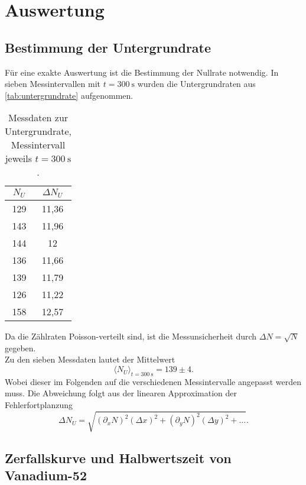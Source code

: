\section{Auswertung}
\label{sec:Auswertung}

\subsection{Bestimmung der Untergrundrate}
\label{sec:aus:untergrundrate}

Für eine exakte Auswertung ist die Bestimmung der Nullrate notwendig.
In sieben Messintervallen mit $t = \SI{300}{\second}$ wurden die 
Untergrundraten aus \autoref{tab:untergrundrate} aufgenommen.
\begin{table}
	\centering
	\caption{Messdaten zur Untergrundrate, Messintervall jeweils $t = \SI{300}{\second}$.}
	\label{tab:untergrundrate}
	\begin{tabular}{c c}
		\toprule
		$N_U$ & $\Delta N_U$ \\
		\midrule
		129 & 11,36 \\
		143 & 11,96 \\
		144 & 12 \\
		136 & 11,66 \\
		139 & 11,79 \\
		126 & 11,22 \\
		158 & 12,57 \\
		\bottomrule
	\end{tabular}
\end{table}

\noindent
Da die Zählraten Poisson-verteilt sind, ist die Messunsicherheit durch $\Delta N = \sqrt{N}$ 
gegeben. \\
Zu den sieben Messdaten lautet der Mittelwert
\begin{equation}
	\langle N_U \rangle_{t = \SI{300}{\second}} = 139 \pm 4.
\end{equation}
Wobei dieser im Folgenden auf die verschiedenen Messintervalle angepasst werden muss.
\noindent
Die Abweichung folgt aus der linearen Approximation der Fehlerfortplanzung
\begin{equation}
	\Delta N_U = \sqrt{(\partial_x N)^2 (\Delta x)^2 + (\partial_y N)^2 (\Delta y)^2 + \hdots}.
	\label{eqn:fehlerfortpflanzung}
\end{equation}

\subsection{Zerfallskurve und Halbwertszeit von Vanadium-52}
\label{sec:aus:vanadium}

